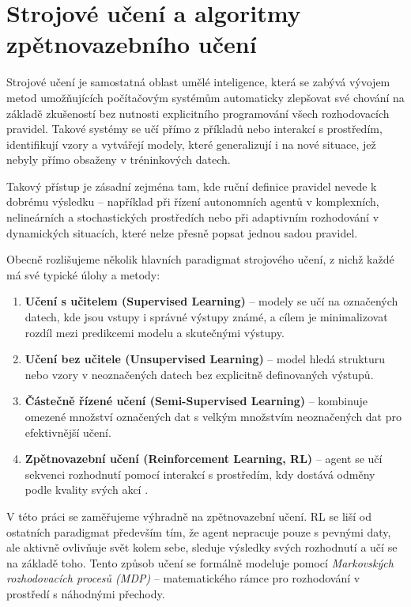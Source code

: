 \section{Strojové učení a algoritmy zpětnovazebního učení}

Strojové učení je samostatná oblast umělé inteligence, která se zabývá vývojem metod umožňujících
počítačovým systémům automaticky zlepšovat své chování na základě zkušeností bez nutnosti explicitního
programování všech rozhodovacích pravidel. Takové systémy se učí přímo z příkladů nebo interakcí
s prostředím, identifikují vzory a vytvářejí modely, které generalizují i na nové situace, jež
nebyly přímo obsaženy v tréninkových datech.

Takový přístup je zásadní zejména tam, kde ruční definice pravidel nevede k dobrému výsledku – například
při řízení autonomních agentů v komplexních, nelineárních a stochastických prostředích nebo při
adaptivním rozhodování v dynamických situacích, které nelze přesně popsat jednou sadou pravidel.

Obecně rozlišujeme několik hlavních paradigmat strojového učení, z nichž každé má své typické úlohy a metody:

\begin{enumerate}
    \item \textbf{Učení s učitelem (Supervised Learning)} – modely se učí na označených datech, kde
    jsou vstupy i správné výstupy známé, a cílem je minimalizovat rozdíl mezi predikcemi modelu a
    skutečnými výstupy.
    \item \textbf{Učení bez učitele (Unsupervised Learning)} – model hledá strukturu nebo vzory v
    neoznačených datech bez explicitně definovaných výstupů.
    \item \textbf{Částečně řízené učení (Semi-Supervised Learning)} – kombinuje omezené množství
    označených dat s velkým množstvím neoznačených dat pro efektivnější učení.
    \item \textbf{Zpětnovazební učení (Reinforcement Learning, RL)} – agent se učí sekvenci rozhodnutí
    pomocí interakcí s prostředím, kdy dostává odměny podle kvality svých akcí \cite{Sutton2018}.
\end{enumerate}

V této práci se zaměřujeme výhradně na zpětnovazební učení. RL se liší od ostatních paradigmat
především tím, že agent nepracuje pouze s pevnými daty, ale aktivně ovlivňuje svět kolem sebe,
sleduje výsledky svých rozhodnutí a učí se na základě toho. Tento způsob učení se formálně modeluje
pomocí \textit{Markovských rozhodovacích procesů (MDP)} – matematického rámce pro rozhodování v
prostředí s náhodnými přechody.

